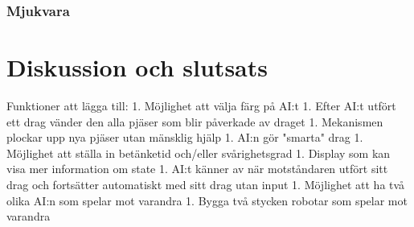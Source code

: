 \documentclass[a4paper]{article}
\begin{document}
\subsubsection{Mjukvara}


\section{Diskussion och slutsats}
Funktioner att lägga till:
1. Möjlighet att välja färg på AI:t
1. Efter AI:t utfört ett drag vänder den alla pjäser som blir påverkade av draget
1. Mekanismen plockar upp nya pjäser utan mänsklig hjälp
1. AI:n gör "smarta" drag
1. Möjlighet att ställa in betänketid och/eller svårighetsgrad
1. Display som kan visa mer information om state
1. AI:t känner av när motståndaren utfört sitt drag och fortsätter automatiskt med sitt drag utan input
1. Möjlighet att ha två olika AI:n som spelar mot varandra
1. Bygga två stycken robotar som spelar mot varandra
\end{document}
